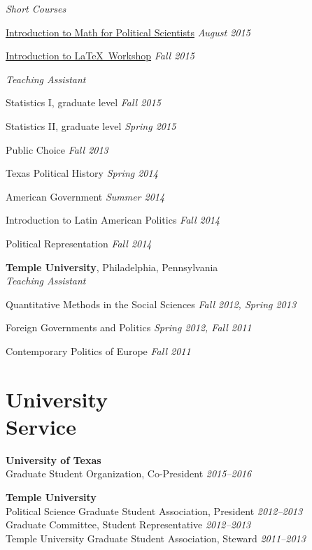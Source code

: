 \documentclass[margin,line]{res}
\newenvironment{list2}{
    \begin{list}{--}{%
        \setlength{\itemsep}{0in}
        \setlength{\parsep}{0in} \setlength{\parskip}{0in}
        \setlength{\topsep}{0in} \setlength{\partopsep}{0in}
        \setlength{\leftmargin}{0.2in}}}{\end{list}}
\begin{document}
\begin{resume}
\emph{Short Courses}
\begin{list2}
\item
  \href{https://github.com/jabranham/math-camp}{Introduction
    to Math for Political Scientists} \hfill \emph{August
    2015}
\item
  \href{https://github.com/jabranham/latex-workshop}{Introduction
    to \LaTeX~Workshop} \hfill \emph{Fall 2015}
\end{list2}

\emph{Teaching Assistant} 
\begin{list2}
\item Statistics I, graduate level \hfill \emph{Fall 2015}
\item Statistics II, graduate level \hfill \emph{Spring 2015}
\item Public Choice \hfill \emph{Fall 2013}
\item Texas Political History \hfill \emph{Spring 2014}
\item American Government \hfill \emph{Summer 2014}
\item Introduction to Latin American Politics \hfill \emph{Fall 2014}
\item Political Representation \hfill \emph{Fall 2014}
\end{list2}

\textbf{Temple University}, Philadelphia, Pennsylvania  \\
\emph{Teaching Assistant}

\begin{list2}
\item Quantitative Methods in the Social Sciences \hfill \emph{Fall 2012, Spring 2013}
\item Foreign Governments and Politics \hfill \emph{Spring 2012, Fall 2011}
\item Contemporary Politics of Europe \hfill \emph{Fall 2011}
\end{list2}

\section{\sc University \\Service}
\textbf{University of Texas} \\
Graduate Student Organization, Co-President \hfill \emph{2015--2016} %

\textbf{Temple University}\\
Political Science Graduate Student Association, President \hfill \emph{2012--2013} \\
Graduate Committee, Student Representative \hfill \emph{2012--2013} \\
Temple University Graduate Student Association, Steward \hfill \emph{2011--2013} %


\end{resume}
\end{document}
